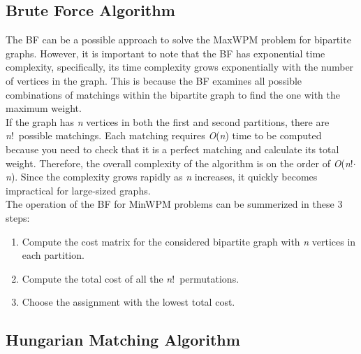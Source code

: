 \subsection{Brute Force Algorithm}
The BF can be a possible approach to solve the MaxWPM problem for bipartite graphs.
However, it is important to note that the BF has exponential time complexity, specifically, its time complexity grows exponentially with the number of vertices in the graph.
This is because the BF examines all possible combinations of matchings within the bipartite graph to find the one with the maximum weight.\\
If the graph has \textit{n} vertices in both the first and second partitions, there are \textit{n}!\ possible matchings.
Each matching requires \textit{O}(\textit{n}) time to be computed because you need to check that it is a perfect matching and calculate its total weight.
Therefore, the overall complexity of the algorithm is on the order of \textit{O}(\textit{n}!$\cdot$\textit{n}).
Since the complexity grows rapidly as \textit{n} increases, it quickly becomes impractical for large-sized graphs. \\
The operation of the BF for MinWPM problems can be summerized in these 3 steps:
\begin{enumerate}
    \item {Compute the cost matrix for the considered bipartite graph with \textit{n} vertices in each partition.}
    \item {Compute the total cost of all the \textit{n}!\ permutations.}
    \item {Choose the assignment with the lowest total cost.}
\end{enumerate}


\subsection{Hungarian Matching Algorithm}

